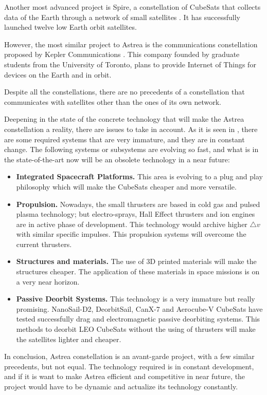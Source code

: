 Another most advanced project is Spire, a constellation of CubeSats that collects data of the Earth through a network of small satellites \cite{spire}. It has successfully launched twelve low Earth orbit satellites.

However, the most similar project to Astrea is the communications constellation proposed by Kepler Communications \cite{keppler}. This company founded by graduate students from the University of Toronto, plans to provide Internet of Things for devices on the Earth and in orbit.

Despite all the constellations, there are no precedents of a constellation that communicates with satellites other than the ones of its own network.

Deepening in the state of the concrete technology that will make the Astrea constellation a reality, there are issues to take in account. As it is seen in \cite{SOTA}, there are some required systems that are very immature, and they are in constant change. The following systems or subsystems are evolving so fast, and what is in the state-of-the-art now will be an obsolete technology in a near future:

\begin{itemize}
\item \textbf{Integrated Spacecraft Platforms.} This area is evolving to a plug and play philosophy which will make the CubeSats cheaper and more versatile.
\item \textbf{Propulsion.} Nowadays, the small thrusters are based in cold gas and pulsed plasma technology; but electro-sprays, Hall Effect thrusters and ion engines are in active phase of development. This technology would archive higher $\bigtriangleup v $ with similar specific impulses. This propulsion systems will overcome the current thrusters.
\item \textbf{Structures and materials.} The use of 3D printed materials will make the structures cheaper. The application of these materials in space missions is on a very near horizon.
\item \textbf{Passive Deorbit Systems.} This technology is a very immature but really promising. NanoSail-D2, DeorbitSail, CanX-7 and Aerocube-V CubeSats have tested successfully drag and electromagnetic passive deorbiting systems. This methods to deorbit LEO CubeSats without the using of thrusters will make the satellites lighter and cheaper.
\end{itemize}

In conclusion, Astrea constellation is an avant-garde project, with a few similar precedents, but not equal. The technology required is in constant development, and if it is want to make Astrea efficient and competitive in near future, the project would have to be dynamic and actualize its technology constantly. 
